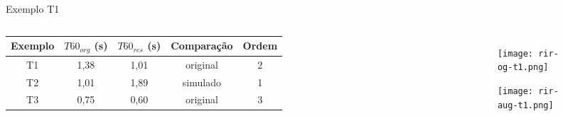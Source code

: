 \begin{frame}{Exemplo T1}
    \begin{columns}
        \begin{table} [H]
            \begin{adjustbox}{width=\columnwidth,center}
                \begin{tabular}{c|c|c|c|c}
            
                    \textbf{Exemplo} & 
                    \textbf{$T60_{org}$ (s)} & 
                    \textbf{$T60_{res}$ (s)} & 
                    \textbf{Comparação} &
                    \textbf{Ordem} \\
                    \hline 
            
                    T1 & 1,38 & 1,01 & original & 2 \\
                    T2 & 1,01 & 1,89 & simulado & 1 \\
                    T3 & 0,75 & 0,60 & original & 3 \\
            
                \end{tabular}
            \end{adjustbox}
        \end{table}

        \begin{figure}
            \begin{subfigure}{\textwidth}
                \centering
                \texttt{[image: rir-og-t1.png]}
            \end{subfigure}
            \begin{subfigure}{\textwidth}
                \centering
                \texttt{[image: rir-aug-t1.png]}
            \end{subfigure}
        \end{figure}
    \end{columns}
        
\end{frame}

